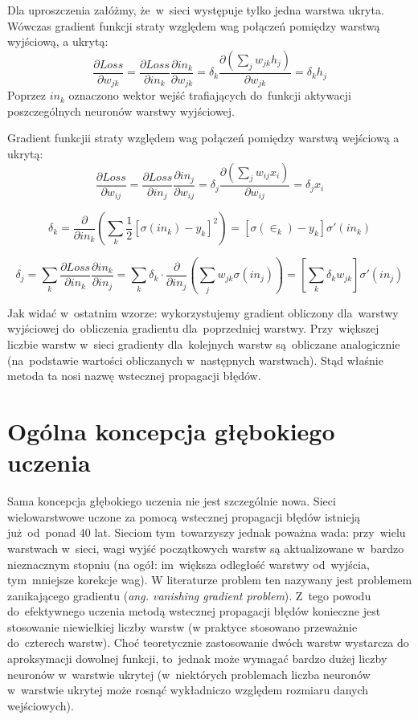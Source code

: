 Dla uproszczenia załóżmy, że~w~sieci występuje tylko jedna warstwa ukryta. Wówczas gradient funkcji straty
względem wag połączeń pomiędzy warstwą wyjściową, a ukrytą:
$$\frac{\partial Loss}{\partial w_{jk}}=\frac{\partial Loss}{\partial in_k}\frac{\partial
in_k}{\partial w_{jk}}= \delta_k \frac{\partial (\sum\limits_j w_{jk}h_j)}{\partial w_{jk}} = \delta_k h_j$$
Poprzez $in_k$ oznaczono wektor wejść trafiających do~funkcji aktywacji poszczególnych neuronów warstwy
wyjściowej.

Gradient funkcjii straty względem wag połączeń pomiędzy warstwą wejściową a ukrytą: 
$$ \frac{\partial Loss}{\partial w_{ij}}=\frac{\partial Loss}{\partial in_j}\frac{\partial in_j}{\partial
w_{ij}} = \delta_j \frac{\partial (\sum\limits_j w_{ij}x_i)}{\partial w_{ij}} = \delta_j x_i $$

$$ \delta_k = \frac{\partial}{\partial in_k}(\sum\limits_k \frac{1}{2}
[\sigma(in_k)-y_k]^2)=[\sigma(\in_k)-y_k]\sigma'(in_k)$$

$$ \delta_j = \sum\limits_k\frac{\partial Loss}{\partial in_k}\frac{\partial in_k}{\partial
in_j}=\sum\limits_k \delta_k \cdot \frac{\partial}{\partial in_j}(\sum\limits_j w_{jk}\sigma(in_j))=[\sum\limits_k \delta_k
w_{jk}]\sigma'(in_j)$$

Jak widać w~ostatnim wzorze: wykorzystujemy gradient obliczony dla~warstwy wyjściowej
do~obliczenia gradientu dla~poprzedniej warstwy. Przy~większej liczbie warstw w~sieci gradienty
dla~kolejnych warstw są~obliczane analogicznie (na~podstawie wartości obliczanych w~następnych warstwach).
Stąd właśnie metoda ta nosi nazwę wstecznej propagacji błędów.


\section{Ogólna koncepcja głębokiego uczenia}
Sama koncepcja głębokiego uczenia nie jest szczególnie nowa. Sieci
wielowarstwowe uczone za pomocą wstecznej propagacji błędów istnieją
już~od~ponad 40 lat. Sieciom tym~towarzyszy jednak poważna wada: przy~wielu
warstwach w~sieci, wagi wyjść początkowych warstw są aktualizowane w~bardzo
nieznacznym stopniu (na ogół: im~większa odległość warstwy od~wyjścia,
tym~mniejsze korekcje wag). W literaturze problem ten nazywany jest problemem
zanikającego gradientu (\textit{ang. vanishing gradient problem}). Z~tego
powodu do~efektywnego uczenia metodą wstecznej propagacji błędów konieczne jest
stosowanie niewielkiej liczby warstw (w praktyce stosowano przeważnie
do~czterech warstw). Choć teoretycznie zastosowanie dwóch warstw
wystarcza do aproksymacji dowolnej funkcji, to~jednak może wymagać bardzo dużej
liczby neuronów w~warstwie ukrytej (w~niektórych problemach liczba neuronów w~warstwie ukrytej może rosnąć
wykładniczo względem rozmiaru danych wejściowych).

